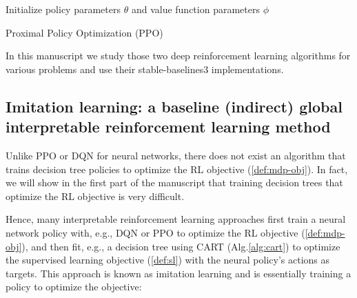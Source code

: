 \begin{algorithm}
    Initialize policy parameters $\theta$ and value function parameters $\phi$ \\
    \caption{Proximal Policy Optimization (PPO)}\label{alg:ppo}
\end{algorithm}
In this manuscript we study those two deep reinforcement learning algorithms for various problems and use their stable-baselines3 implementations\cite{stable-baselines3}.

\subsection{Imitation learning: a baseline (indirect) global interpretable reinforcement learning method}\label{sec:imit}

Unlike PPO or DQN for neural networks, there does not exist an algorithm that trains decision tree policies to optimize the RL objective (\ref{def:mdp-obj}).
In fact, we will show in the first part of the manuscript that training decision trees that optimize the RL objective is very difficult.

Hence, many interpretable reinforcement learning approaches first train a neural network policy with, e.g., DQN or PPO to optimize the RL objective (\ref{def:mdp-obj}), and then fit, e.g., a decision tree using CART (Alg.\ref{alg:cart}) to optimize the supervised learning objective (\ref{def:sl}) with the neural policy's actions as targets.
This approach is known as imitation learning and is essentially training a policy to optimize the objective:

